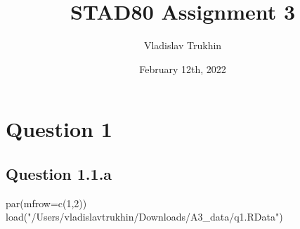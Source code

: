 \documentclass[
]{article}
\title{STAD80 Assignment 3}
\author{Vladislav Trukhin}
\date{February 12th, 2022}
\newenvironment{Shaded}{\begin{snugshade}}{\end{snugshade}}
\newcommand{\AttributeTok}[1]{\textcolor[rgb]{0.77,0.63,0.00}{#1}}
\newcommand{\DecValTok}[1]{\textcolor[rgb]{0.00,0.00,0.81}{#1}}
\newcommand{\FunctionTok}[1]{\textcolor[rgb]{0.00,0.00,0.00}{#1}}
\newcommand{\NormalTok}[1]{#1}
\newcommand{\StringTok}[1]{\textcolor[rgb]{0.31,0.60,0.02}{#1}}
\begin{document}
\maketitle

{
\setcounter{tocdepth}{2}
\tableofcontents
}
\hypertarget{question-1}{%
\section{Question 1}\label{question-1}}

\hypertarget{question-1.1.a}{%
\subsection{Question 1.1.a}\label{question-1.1.a}}

\begin{Shaded}
\begin{Highlighting}[]
\FunctionTok{par}\NormalTok{(}\AttributeTok{mfrow=}\FunctionTok{c}\NormalTok{(}\DecValTok{1}\NormalTok{,}\DecValTok{2}\NormalTok{))}
\FunctionTok{load}\NormalTok{(}\StringTok{"/Users/vladislavtrukhin/Downloads/A3\_data/q1.RData"}\NormalTok{)}


\end{Highlighting}
\end{Shaded}
\end{document}
